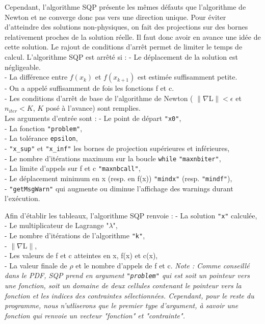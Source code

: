 Cependant, l'algorithme SQP présente les mêmes défauts que l'algorithme de Newton et ne converge donc pas vers une direction unique. Pour éviter d'atteindre des solutions non-physiques, on fait des projections sur des bornes relativement proches de la solution réelle. Il faut donc avoir en avance une idée de cette solution.\bigbreak
\indent Le rajout de conditions d'arrêt permet de limiter le temps de calcul. L'algorithme SQP est arrêté si :\medbreak
- Le déplacement de la solution est négligeable.\\
\indent- La différence entre $f(x_k) $ et $f(x_{k+1})$ est estimée suffisamment petite.\\
\indent- On a appelé suffisamment de fois les fonctions f et c.\\
\indent- Les conditions d'arrêt de base de l'algorithme de Newton ( $\| \nabla $L$ \| < \epsilon$ et $n_{iter} < K$, $K$ posé à l'avance) sont remplies.\\
\newpage
Les arguments d'entrée sont :\medbreak
\indent- Le point de départ \texttt{"x0"},\\
\indent- La fonction \texttt{"problem"},\\
\indent- La tolérance \texttt{epsilon},\\
\indent- \texttt{"x\_sup"} et \texttt{"x\_inf"} les bornes de projection supérieures et inférieures,\\
\indent- Le nombre d'itérations maximum sur la boucle \texttt{while} \texttt{"maxnbiter"},\\
\indent- La limite d'appels sur f et c \texttt{"maxnbcall"},\\
\indent- Le déplacement minimum en x (resp. en f(x)) \texttt{"mindx"} (resp. \texttt{"mindf"}),\\
\indent- \texttt{"getMsgWarn"} qui augmente ou diminue l'affichage des warnings durant l'exécution.\medbreak

Afin d'établir les tableaux, l'algorithme SQP renvoie :\medbreak
\indent- La solution \texttt{"x"} calculée,\\
\indent- Le multiplicateur de Lagrange "$\lambda$",\\
\indent- Le nombre d'itérations de l'algorithme \texttt{"k"},\\
\indent- $\| \nabla$L$ \|$,\\
\indent- Les valeurs de f et c atteintes en x, f(x) et c(x),\\
\indent- La valeur finale de $\rho$ et le nombre d'appels de f et c.
\bigbreak
\textit{Note : Comme conseillé dans le PDF, SQP prend en argument \texttt{"problem"} qui est soit un pointeur vers une fonction, soit un domaine de deux cellules contenant le pointeur vers la fonction et les indices des contraintes sélectionnées. Cependant, pour le reste du programme, nous n'utliserons que le premier type d'argument, à savoir une fonction qui renvoie un vecteur "fonction" et "contrainte".}\bigbreak

